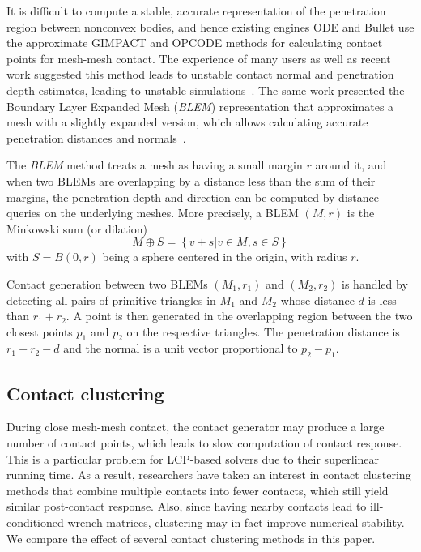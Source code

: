 It is difficult to compute a stable, accurate representation of the penetration region between nonconvex bodies, and hence existing engines ODE and Bullet use the approximate GIMPACT and OPCODE methods for calculating contact points for mesh-mesh contact. The experience of many users as well as recent work suggested this method leads to unstable contact normal and penetration depth estimates, leading to unstable simulations~\cite{Hauser13BLEM}.  The same work presented the Boundary Layer Expanded Mesh (\emph{BLEM}) representation that approximates a mesh with a slightly expanded version, which allows calculating accurate penetration distances and normals~\cite{Hauser13BLEM}. 

The \emph{BLEM} method treats a mesh as having a small margin $r$ around it, and when two BLEMs are overlapping by a distance less than the sum of their margins, the penetration depth and direction can be computed by distance queries on the underlying meshes.  More precisely, a BLEM $(M,r)$ is the Minkowski sum (or dilation) 
\begin{equation}
M \oplus S=\left\{v+s|v \in M,s \in S\right\}
\end{equation}
with $S=B(0,r)$ being a sphere centered in the origin, with radius $r$.

Contact generation between two BLEMs $(M_1,r_1)$ and $(M_2,r_2)$ is handled by detecting all pairs of primitive triangles in $M_1$ and $M_2$ whose distance $d$ is less than $r_1+r_2$.  A point is then generated in the overlapping region between the two closest points $p_1$ and $p_2$ on the respective triangles.  The penetration distance is $r_1+r_2-d$ and the normal is a unit vector proportional to $p_2-p_1$.


\subsection{Contact clustering}

During close mesh-mesh contact, the contact generator may produce a large number of contact points, which leads to slow computation of contact response. This is a particular problem for LCP-based solvers due to their superlinear running time.  As a result, researchers have taken an interest in contact clustering methods that combine multiple contacts into fewer contacts, which still yield similar post-contact response.  Also, since having nearby contacts lead to ill-conditioned wrench matrices, clustering may in fact improve numerical stability.  We compare the effect of several contact clustering methods in this paper.

